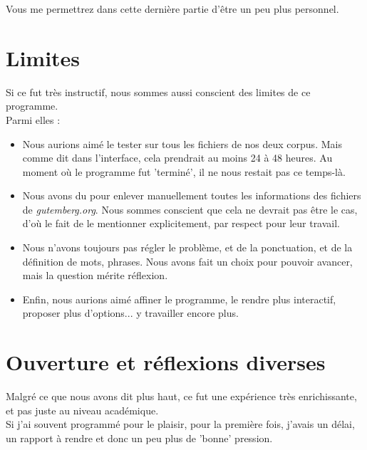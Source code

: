 Vous me permettrez dans cette dernière partie d'être un peu plus personnel. 

 \section{Limites}

Si ce fut très instructif, nous sommes aussi conscient des limites de ce programme. \\

Parmi elles : 
\begin{itemize}
\item Nous aurions aimé le tester sur tous les fichiers de nos deux corpus. Mais comme dit dans l'interface, cela prendrait au moins 24 à 48 heures. Au moment où le programme fut 'terminé', il ne nous restait pas ce temps-là. \\

\item Nous avons du pour enlever manuellement toutes les informations des fichiers de \emph{gutemberg.org}. Nous sommes conscient que cela ne devrait pas être le cas, d'où le fait de le mentionner explicitement, par respect pour leur travail. \\

\item Nous n'avons toujours pas régler le problème, et de la ponctuation, et de la définition de mots, phrases. Nous avons fait un choix pour pouvoir avancer, mais la question mérite réflexion. \\

\item Enfin, nous aurions aimé affiner le programme, le rendre plus interactif, proposer plus d'options... y travailler encore plus.
\end{itemize}

\section{Ouverture et réflexions diverses}

Malgré ce que nous avons dit plus haut, ce fut une expérience très enrichissante, et pas juste au niveau académique. \\

Si j'ai souvent programmé pour le plaisir, pour la première fois, j'avais un délai, un rapport à rendre et donc un peu plus de 'bonne' pression. \\

